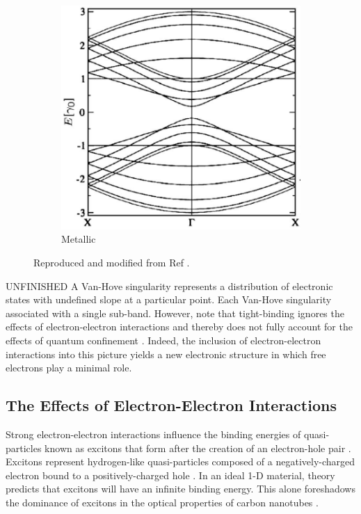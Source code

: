 \begin{figure}[h]
\begin{subfigure}{0.45\textwidth}
		\includegraphics[scale=0.38]{images/chapter_optical_props/ten_zero_band_charlier_2}
		\caption{Metallic}
	\end{subfigure}
	\caption{Reproduced and modified from Ref \cite{charlier2007electronic}.}
\end{figure}

{\color{red}UNFINISHED} A Van-Hove singularity represents a distribution of electronic states with undefined slope at a particular point. Each Van-Hove singularity associated with a single sub-band. However, note that tight-binding ignores the effects of electron-electron interactions and thereby does not fully account for the effects of quantum confinement \cite{weismanKonoBook}. Indeed, the inclusion of electron-electron interactions into this picture yields a new electronic structure in which free electrons play a minimal role.

\subsection{The Effects of Electron-Electron Interactions}
Strong electron-electron interactions influence the binding energies of quasi-particles known as excitons that form after the creation of an electron-hole pair \cite{koch2006semiconductor}. Excitons represent hydrogen-like quasi-particles composed of a negatively-charged electron bound to a positively-charged hole \cite{koch2006semiconductor}. In an ideal 1-D material, theory predicts that excitons will have an infinite binding energy. This alone foreshadows the dominance of excitons in the optical properties of carbon nanotubes \cite{ando2005theory}. 

